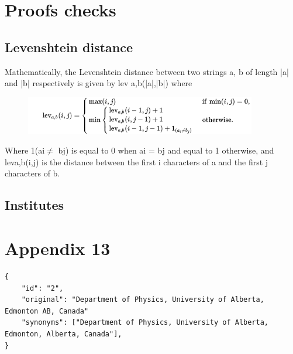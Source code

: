 \section{Proofs checks}%
\label{app:proofs}

\subsection{Levenshtein distance}%
\label{app:proofs:levenshtein}

Mathematically, the Levenshtein distance between two strings a, b of length |a| and |b| respectively is given by lev a,b(|a|,|b|) where

\begin{figure}[htb]
  \centering
  \includegraphics[width=0.9\textwidth]{figures/levenshtein.png}
  \label{fig:levenshtein}
\end{figure}

Where 1(ai$\neq$ bj) is equal to 0 when ai = bj and equal to 1 otherwise, and leva,b(i,j) is the distance between the first i characters of a and the first j characters of b.


\subsection{Institutes}%
\label{app:proofs:institute}
\section*{Appendix 13}
\label{sec:app13}

\begin{lstlisting}
{
    "id": "2", 
    "original": "Department of Physics, University of Alberta, Edmonton AB, Canada"
    "synonyms": ["Department of Physics, University of Alberta, Edmonton, Alberta, Canada"],
}
\end{lstlisting}



